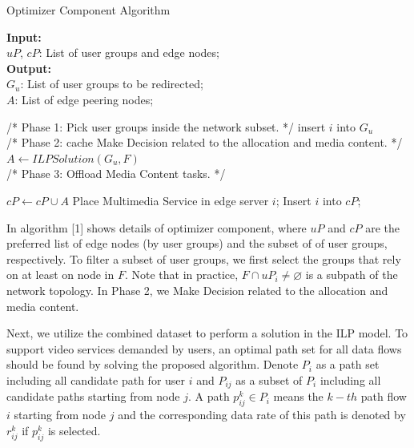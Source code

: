 \begin{algorithm} \caption{Optimizer Component Algorithm}
\textbf{Input:}  \\
\hspace*{\algorithmicindent} $uP$, $cP$: List of user groups and edge nodes; \\
\textbf{Output:}  \\
\hspace*{\algorithmicindent} $G_{u}$: List of user groups to be redirected; \\
\hspace*{\algorithmicindent} $A$: List of edge peering nodes; \\
\begin{algorithmic}[1]
\State /* Phase 1: Pick user groups inside the network subset. */
		\State insert $i$ into $G_{u}$
	\EndIf
\EndFor \\

\State /* Phase 2: cache Make Decision related to the allocation and media content. */ 
\State $A \leftarrow ILP Solution(G_{u}, F)$  \\ %

\State /* Phase 3: Offload Media Content tasks. */

\State $cP \leftarrow cP \cup A $
	\State Place Multimedia Service in edge server $i$;
		\State Insert $i$ into $cP$;
	\EndIf
\EndFor


\end{algorithmic}
\end{algorithm}

In algorithm [1] shows details of optimizer component, where $uP$ and $cP$ are the preferred list of edge nodes (by user groups) and the subset of of user groups, respectively.
To filter a subset of user groups, we first select the groups that rely on at least on node in $F$. Note that in practice, $F \cap uP_{i} \neq \varnothing$ is a subpath of the network topology. In Phase 2, we Make Decision related to the allocation and media content.

Next, we utilize the combined dataset to perform a solution in the ILP model.
To support video services demanded by users, an optimal path set for all data flows should be found by solving the proposed algorithm. Denote $P_{i}$ as a path set including all candidate path for user $i$ and $P_{ij}$ as a subset of $P_{i}$ including all candidate paths starting from node $j$. A path $p_{ij}^{k} \in P_{i}$ means the $k-th$ path flow $i$ starting from node $j$ and the corresponding data rate of this path is denoted by $r_{ij}^{k}$ if $p_{ij}^{k}$ is selected.

